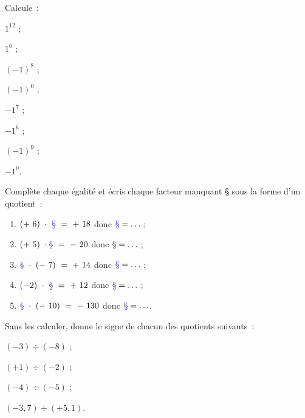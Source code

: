 \begin{exercice}[Puissance de 1 ou de $- 1$]
Calcule :
\begin{colenumerate}{4}
 \item $1^{12}$ ;
 \item $1^{0}$ ;
 \item $(- 1)^{8}$ ;
 \item $(- 1)^{0}$ ;
 \item $- 1^{7}$ ;
 \item $- 1^{6}$ ;
 \item $(- 1)^{9}$ ;
 \item $- 1^{0}$.
 \end{colenumerate}
\end{exercice}



\begin{exercice}
Complète chaque égalité et écris chaque facteur manquant \textcolor{PartieGeometrie}{§} sous la forme d'un quotient :
\begin{enumerate}
 \item $(+ 6) \cdot \text{\textcolor{PartieGeometrie}{§}} = + 18$ donc $\text{\textcolor{PartieGeometrie}{§}} = \ldots$ ;
 \item $(+ 5) \cdot \text{\textcolor{PartieGeometrie}{§}} = - 20$ donc $\text{\textcolor{PartieGeometrie}{§}} = \ldots$ ;
 \item $\text{\textcolor{PartieGeometrie}{§}} \cdot (- 7) = + 14$ donc  $\text{\textcolor{PartieGeometrie}{§}} = \ldots$ ;
 \item $(- 2) \cdot \text{\textcolor{PartieGeometrie}{§}} = + 12$ donc  $\text{\textcolor{PartieGeometrie}{§}} = \ldots$ ;
 \item $\text{\textcolor{PartieGeometrie}{§}} \cdot (- 10) = - 130$ donc  $\text{\textcolor{PartieGeometrie}{§}} = \ldots$.
 \end{enumerate}
\end{exercice}


\begin{exercice}
Sans les calculer, donne le signe de chacun des quotients suivants :
\begin{colenumerate}{2}
 \item $(- 3) \div (- 8)$ ;
 \item $(+ 1) \div (- 2)$ ;
 \item $(- 4) \div (- 5)$ ;
 \item $(- 3,7) \div (+ 5,1)$.
 \end{colenumerate}
\end{exercice}


